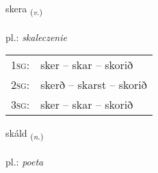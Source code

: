 \documentclass[frontgrid, backgrid]{flacards}\usepackage[]{graphicx}\usepackage[]{xcolor}
\begin{document}
\renewcommand{\flhead}{\vskip5pt \fboxsep=0pt {\small\bfseries\footnotesize Sagnorð | czasownik}}
\renewcommand{\fcfoot}{\vskip5pt \fboxsep=0pt \hspace{2pt}{\small\bfseries\footnotesize 1K}}

\renewcommand{\blhead}{\vskip5pt {\small\bfseries\footnotesize Sagnorð | czasownik }}
\renewcommand{\bcfoot}{\vskip5pt \hspace{2pt}{\small\bfseries\footnotesize 1K}}


{skera \small{\textsubscript{(\textit{v.})}} \\[1ex] %
\textphonetic{[scɛːra]} \\
pl.: \emph{skaleczenie} \\  [2ex]
\renewcommand*{\arraystretch}{0.8}
\begin{tabular}{p{1cm}l}
\textsc{1sg}: & sker -- skar -- skorið \\ 
\textsc{2sg}: & skerð -- skarst -- skorið \\ 
\textsc{3sg}: & sker -- skar -- skorið \\ 
\end{tabular}
}

\renewcommand{\flhead}{\vskip5pt \fboxsep=0pt {\small\bfseries\footnotesize Nafnorð | rzeczownik}}
\renewcommand{\fcfoot}{\vskip5pt \fboxsep=0pt \hspace{2pt}{\small\bfseries\footnotesize 1K}}

\renewcommand{\blhead}{\vskip5pt {\small\bfseries\footnotesize Nafnorð | rzeczownik }}
\renewcommand{\bcfoot}{\vskip5pt \hspace{2pt}{\small\bfseries\footnotesize 1K}}


{skáld \small{\textsubscript{(\textit{n.})}} \\[1ex] %
\textphonetic{[skault]} \\
pl.: \emph{poeta} \\  [2ex]
\renewcommand*{\arraystretch}{0.8}
}
\end{document}
